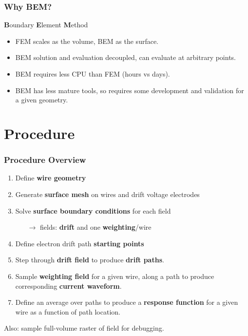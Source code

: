 \documentclass[xcolor=dvipsnames]{beamer}
\begin{document}
\begin{frame}
  \frametitle{Why BEM?}
  \textbf{B}oundary \textbf{E}lement \textbf{M}ethod
  \begin{itemize}
  \item FEM scales as the volume, BEM as the surface.
  \item BEM solution and evaluation decoupled, can evaluate at
    arbitrary points.
  \item BEM requires less CPU than FEM (hours vs days).
  \item BEM has less mature tools, so requires some development and
    validation for a given geometry.
  \end{itemize}
\end{frame}

\section{Procedure}

\begin{frame}
  \frametitle{Procedure Overview}
  \begin{enumerate}
  \item Define \textbf{wire geometry}
  \item Generate \textbf{surface mesh} on wires and drift voltage electrodes
  \item Solve \textbf{surface boundary conditions} for each field
    \begin{itemize}
    \item [$\rightarrow$] fields: \textbf{drift} and one \textbf{weighting}/wire
    \end{itemize}
  \item Define electron drift path \textbf{starting points}
  \item Step through \textbf{drift field} to produce \textbf{drift paths}.
  \item Sample \textbf{weighting field} for a given wire, along a path
    to produce corresponding \textbf{current waveform}.
  \item Define an average over paths to produce a \textbf{response
      function} for a given wire as a function of path location.
  \end{enumerate}
  Also: sample full-volume raster of field for debugging.
\end{frame}
\end{document}

